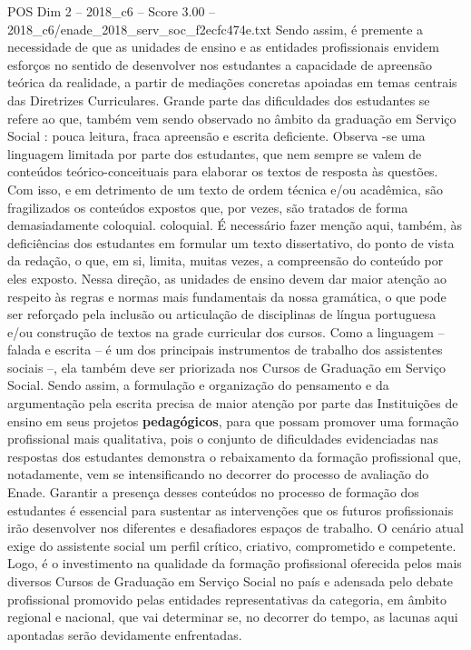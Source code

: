 \begin{textsample}{POS Dim 2 – 2018\_c6 – Score 3.00 – 2018\_c6/enade\_2018\_serv\_soc\_f2ecfc474e.txt}
Sendo assim, é premente a necessidade de que as unidades de ensino e as entidades profissionais envidem esforços no sentido de desenvolver nos estudantes a capacidade de apreensão teórica da realidade, a partir de mediações concretas apoiadas em temas centrais das Diretrizes Curriculares.
Grande parte das dificuldades dos estudantes se refere ao que, também vem sendo observado no âmbito da graduação em Serviço Social : pouca leitura, fraca apreensão e escrita deficiente.
Observa -se uma linguagem limitada por parte dos estudantes, que nem sempre se valem de conteúdos teórico-conceituais para elaborar os textos de resposta às questões.
Com isso, e em detrimento de um texto de ordem técnica e/ou acadêmica, são fragilizados os conteúdos expostos que, por vezes, são tratados de forma demasiadamente coloquial. coloquial.
É necessário fazer menção aqui, também, às deficiências dos estudantes em formular um texto dissertativo, do ponto de vista da redação, o que, em si, limita, muitas vezes, a compreensão do conteúdo por eles exposto.
Nessa direção, as unidades de ensino devem dar maior atenção ao respeito às regras e normas mais fundamentais da nossa gramática, o que pode ser reforçado pela inclusão ou articulação de disciplinas de língua portuguesa e/ou construção de textos na grade curricular dos cursos.
Como a linguagem – falada e escrita – é um dos principais instrumentos de trabalho dos assistentes sociais –, ela também deve ser priorizada nos Cursos de Graduação em Serviço Social.
Sendo assim, a formulação e organização do pensamento e da argumentação pela escrita precisa de maior atenção por parte das Instituições de ensino em seus projetos \textbf{pedagógicos}, para que possam promover uma formação profissional mais qualitativa, pois o conjunto de dificuldades evidenciadas nas respostas dos estudantes demonstra o rebaixamento da formação profissional que, notadamente, vem se intensificando no decorrer do processo de avaliação do Enade.
Garantir a presença desses conteúdos no processo de formação dos estudantes é essencial para sustentar as intervenções que os futuros profissionais irão desenvolver nos diferentes e desafiadores espaços de trabalho.
O cenário atual exige do assistente social um perfil crítico, criativo, comprometido e competente.
Logo, é o investimento na qualidade da formação profissional oferecida pelos mais diversos Cursos de Graduação em Serviço Social no país e adensada pelo debate profissional promovido pelas entidades representativas da categoria, em âmbito regional e nacional, que vai determinar se, no decorrer do tempo, as lacunas aqui apontadas serão devidamente enfrentadas.

\end{textsample}

